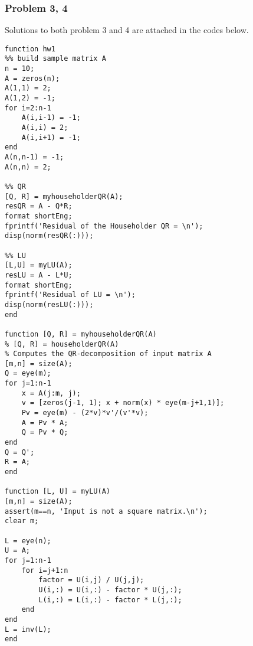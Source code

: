 \documentclass[12pt,a4paper]{article}
\begin{document}
\newpage\subsubsection*{Problem 3, 4}
Solutions to both problem 3 and 4 are attached in the codes below. 
\begin{verbatim}
function hw1
%% build sample matrix A
n = 10;
A = zeros(n);
A(1,1) = 2;
A(1,2) = -1;
for i=2:n-1
    A(i,i-1) = -1;
    A(i,i) = 2;
    A(i,i+1) = -1;
end
A(n,n-1) = -1;
A(n,n) = 2;

%% QR
[Q, R] = myhouseholderQR(A);
resQR = A - Q*R;
format shortEng;
fprintf('Residual of the Householder QR = \n');
disp(norm(resQR(:)));

%% LU
[L,U] = myLU(A);
resLU = A - L*U;
format shortEng;
fprintf('Residual of LU = \n');
disp(norm(resLU(:)));
end

function [Q, R] = myhouseholderQR(A)
% [Q, R] = householderQR(A)
% Computes the QR-decomposition of input matrix A
[m,n] = size(A);
Q = eye(m);
for j=1:n-1
    x = A(j:m, j);
    v = [zeros(j-1, 1); x + norm(x) * eye(m-j+1,1)];
    Pv = eye(m) - (2*v)*v'/(v'*v);
    A = Pv * A;
    Q = Pv * Q;
end
Q = Q';
R = A;
end

function [L, U] = myLU(A)
[m,n] = size(A);
assert(m==n, 'Input is not a square matrix.\n');
clear m;

L = eye(n);
U = A;
for j=1:n-1
    for i=j+1:n
        factor = U(i,j) / U(j,j);
        U(i,:) = U(i,:) - factor * U(j,:);
        L(i,:) = L(i,:) - factor * L(j,:);
    end
end
L = inv(L);
end
\end{verbatim}
\end{document}
